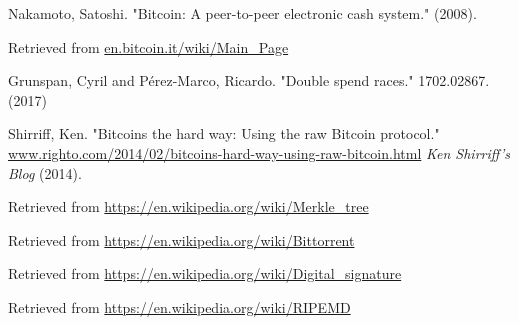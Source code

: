 \documentclass[12pt,a4paper]{article}
\begin{document}
\begin{thebibliography}{1}
\newblock Nakamoto, Satoshi.
\newblock "Bitcoin: A peer-to-peer electronic cash system." (2008).

\newblock Retrieved from \url{en.bitcoin.it/wiki/Main_Page}

Grunspan, Cyril and Pérez-Marco, Ricardo.
\newblock "Double spend races."
 1702.02867.(2017)

Shirriff, Ken.
\newblock "Bitcoins the hard way: Using the raw Bitcoin protocol."
\newblock \url{www.righto.com/2014/02/bitcoins-hard-way-using-raw-bitcoin.html} {\em Ken Shirriff's Blog} (2014).


\newblock Retrieved from \url{https://en.wikipedia.org/wiki/Merkle_tree}

\newblock Retrieved from \url{https://en.wikipedia.org/wiki/Bittorrent}

\newblock Retrieved from \url{https://en.wikipedia.org/wiki/Digital_signature}

\newblock Retrieved from \url{https://en.wikipedia.org/wiki/RIPEMD}

\url{}
\end{thebibliography}
\end{document}
